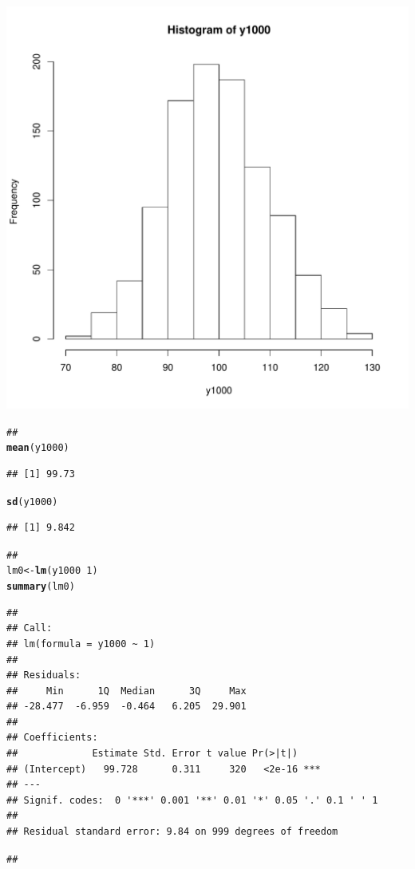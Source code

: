 \documentclass{article}\usepackage[]{graphicx}\usepackage[]{color}
\makeatletter
\def\maxwidth{ %
  \ifdim\Gin@nat@width>\linewidth
    \linewidth
  \else
    \Gin@nat@width
  \fi
}
\newcommand{\hlnum}[1]{\textcolor[rgb]{0.686,0.059,0.569}{#1}}%
\newcommand{\hlcom}[1]{\textcolor[rgb]{0.678,0.584,0.686}{\textit{#1}}}%
\newcommand{\hlopt}[1]{\textcolor[rgb]{0,0,0}{#1}}%
\newcommand{\hlstd}[1]{\textcolor[rgb]{0.345,0.345,0.345}{#1}}%
\newcommand{\hlkwb}[1]{\textcolor[rgb]{0.69,0.353,0.396}{#1}}%
\newcommand{\hlkwd}[1]{\textcolor[rgb]{0.737,0.353,0.396}{\textbf{#1}}}%
\newenvironment{kframe}{%
 \def\at@end@of@kframe{}%
 \ifinner\ifhmode%
  \def\at@end@of@kframe{\end{minipage}}%
  \begin{minipage}{\columnwidth}%
 \fi\fi%
 \def\FrameCommand##1{\hskip\@totalleftmargin \hskip-\fboxsep
 \colorbox{shadecolor}{##1}\hskip-\fboxsep
     \hskip-\linewidth \hskip-\@totalleftmargin \hskip\columnwidth}%
 \MakeFramed {\advance\hsize-\width
   \@totalleftmargin\z@ \linewidth\hsize
   \@setminipage}}%
 {\par\unskip\endMakeFramed%
 \at@end@of@kframe}
\newenvironment{knitrout}{}{} %
\makeatother
\begin{document}
\begin{knitrout}
\includegraphics[width=\maxwidth]{figure/unnamed-chunk-12} 
\begin{kframe}\begin{alltt}
\hlcom{## }
\hlkwd{mean}\hlstd{(y1000)}
\end{alltt}
\begin{verbatim}
## [1] 99.73
\end{verbatim}
\begin{alltt}
\hlkwd{sd}\hlstd{(y1000)}
\end{alltt}
\begin{verbatim}
## [1] 9.842
\end{verbatim}
\begin{alltt}
\hlcom{## }
\hlstd{lm0} \hlkwb{<-} \hlkwd{lm}\hlstd{(y1000} \hlopt{~} \hlnum{1}\hlstd{)}
\hlkwd{summary}\hlstd{(lm0)}
\end{alltt}
\begin{verbatim}
## 
## Call:
## lm(formula = y1000 ~ 1)
## 
## Residuals:
##     Min      1Q  Median      3Q     Max 
## -28.477  -6.959  -0.464   6.205  29.901 
## 
## Coefficients:
##             Estimate Std. Error t value Pr(>|t|)    
## (Intercept)   99.728      0.311     320   <2e-16 ***
## ---
## Signif. codes:  0 '***' 0.001 '**' 0.01 '*' 0.05 '.' 0.1 ' ' 1
## 
## Residual standard error: 9.84 on 999 degrees of freedom
\end{verbatim}
\begin{alltt}
## 
\end{alltt}
\end{kframe}
\end{knitrout}
\end{document}
